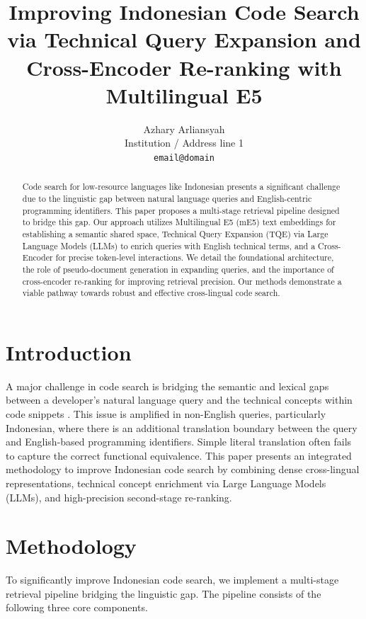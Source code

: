 \documentclass[11pt]{article}
\title{Improving Indonesian Code Search via Technical Query Expansion and \\ Cross-Encoder Re-ranking with Multilingual E5}
\author{Azhary Arliansyah \\
  Institution / Address line 1 \\
  \texttt{email@domain} \\}
\begin{document}
\maketitle

\begin{abstract}
Code search for low-resource languages like Indonesian presents a significant challenge due to the linguistic gap between natural language queries and English-centric programming identifiers. This paper proposes a multi-stage retrieval pipeline designed to bridge this gap. Our approach utilizes Multilingual E5 (mE5) text embeddings for establishing a semantic shared space, Technical Query Expansion (TQE) via Large Language Models (LLMs) to enrich queries with English technical terms, and a Cross-Encoder for precise token-level interactions. We detail the foundational architecture, the role of pseudo-document generation in expanding queries, and the importance of cross-encoder re-ranking for improving retrieval precision. Our methods demonstrate a viable pathway towards robust and effective cross-lingual code search.
\end{abstract}

\section{Introduction}
A major challenge in code search is bridging the semantic and lexical gaps between a developer's natural language query and the technical concepts within code snippets \cite{cosqa2021}. This issue is amplified in non-English queries, particularly Indonesian, where there is an additional translation boundary between the query and English-based programming identifiers. Simple literal translation often fails to capture the correct functional equivalence. This paper presents an integrated methodology to improve Indonesian code search by combining dense cross-lingual representations, technical concept enrichment via Large Language Models (LLMs), and high-precision second-stage re-ranking. 

\section{Methodology}
To significantly improve Indonesian code search, we implement a multi-stage retrieval pipeline bridging the linguistic gap. The pipeline consists of the following three core components.
\end{document}
